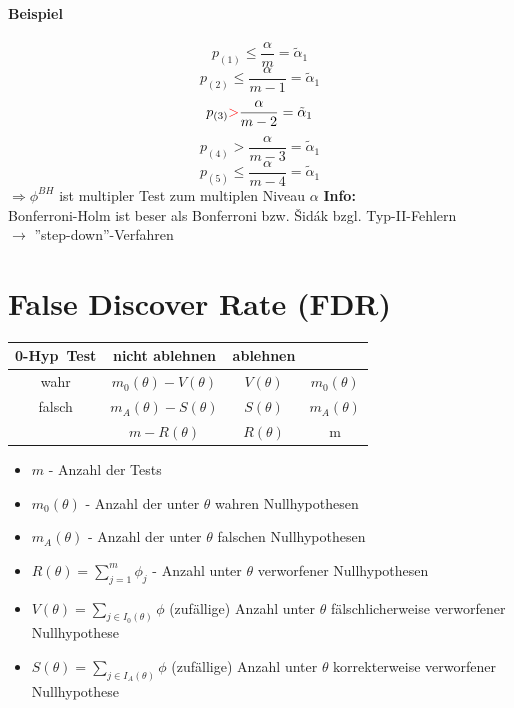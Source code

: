 \documentclass[10pt]{report}
\theoremstyle{definition}
\begin{document}
\paragraph{Beispiel}
\[ p_{(1)} \leq \frac{\alpha}{m} = \tilde{\alpha}_1 \]
\[ p_{(2)} \leq \frac{\alpha}{m-1} = \tilde{\alpha}_1 \]
\[ p_{(3)} \textcolor{red}{>} \frac{\alpha}{m-2} = \tilde{\alpha}_1 \]
\[ p_{(4)} > \frac{\alpha}{m-3} = \tilde{\alpha}_1 \]
\[ p_{(5)} \leq \frac{\alpha}{m-4} = \tilde{\alpha}_1 \]
$\Rightarrow \phi^{BH}$ ist multipler Test zum multiplen Niveau $\alpha$ 
\textbf{Info:} \\
Bonferroni-Holm ist beser als Bonferroni bzw. \v Sid\'ak bzgl. Typ-II-Fehlern\\
$\rightarrow$ ''step-down''-Verfahren

\section{False Discover Rate (FDR) }
\begin{tabular}{c|c|c|c}
0-Hyp\ Test & nicht ablehnen & ablehnen & \\ \hline
wahr & \cellcolor{yellow!25} $m_0 (\theta) - V(\theta)$ & \cellcolor{yellow!25}$V(\theta)$ & \cellcolor{yellow!25}$m_0(\theta)$\\ \hline
falsch &\cellcolor{yellow!25}$m_A (\theta) - S(\theta)$  &\cellcolor{yellow!25} $S(\theta)$ &\cellcolor{yellow!25} $m_A(\theta)$\\ \hline
& \cellcolor{red!25}$m-R(\theta)$ & \cellcolor{red!25}$R(\theta)$ & m\\
\end{tabular}

\begin{itemize}
 \item $m$ - Anzahl der Tests \\
 \item $m_0 (\theta)$ - Anzahl der unter $\theta$ wahren Nullhypothesen \\
 \item $m_A (\theta)$ - Anzahl der unter $\theta$ falschen Nullhypothesen \\
 \item $R(\theta) = \sum\limits_{j=1}^m \phi_j$ - Anzahl unter $\theta$ verworfener Nullhypothesen
 \item $V(\theta) = \sum\limits_{j \in I_0(\theta)} \phi $ (zufällige) Anzahl unter $\theta$ fälschlicherweise verworfener Nullhypothese 
 \item $S(\theta) = \sum\limits_{j \in I_A(\theta)} \phi $ (zufällige) Anzahl unter $\theta$ korrekterweise verworfener Nullhypothese 
\end{itemize}
\end{document}
